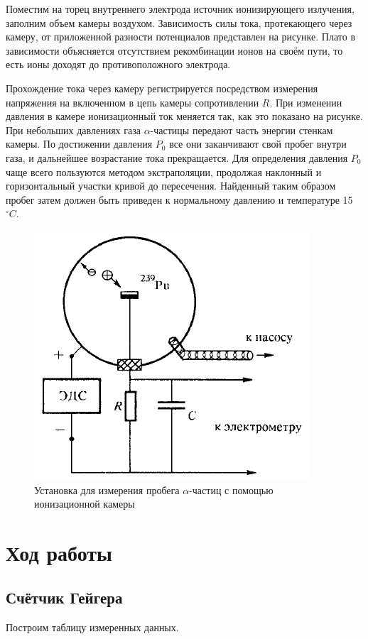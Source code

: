 \documentclass[a4paper, 12pt]{article}%
\begin{document}
    Поместим на торец внутреннего электрода источник ионизирующего излучения, заполним объем камеры воздухом. Зависимость силы тока, протекающего через камеру, от приложенной разности потенциалов представлен на рисунке. Плато в зависимости объясняется отсутствием рекомбинации ионов на своём пути, то есть ионы доходят до противоположного электрода.

    Прохождение тока через камеру регистрируется посредством измерения напряжения на включенном в цепь камеры сопротивлении $R$. При изменении давления в камере ионизационный ток меняется так, как это показано на рисунке. При небольших давлениях газа $\alpha$-частицы передают часть энергии стенкам камеры. По достижении давления $P_0$ все они заканчивают свой пробег внутри газа, и дальнейшее возрастание тока прекращается. Для определения давления $P_0$ чаще всего пользуются методом экстраполяции, продолжая наклонный и горизонтальный участки кривой до пересечения. Найденный таким образом пробег затем должен быть приведен к нормальному давлению и температуре 15 $^\circ C$.

    \begin{figure}[h!]
        \centering
        \includegraphics[width = 7 cm]{pic4.png}
        \caption{Установка для измерения пробега $\alpha$-частиц с помощью ионизационной камеры}
        \label{}
    \end{figure}

    
\section{Ход работы}
\subsection{Счётчик Гейгера}

    Построим таблицу измеренных данных.
\end{document}
